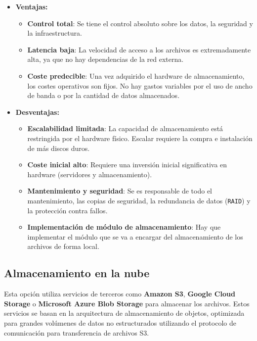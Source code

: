 \begin{itemize}
    \item \textbf{Ventajas:}
    \begin{itemize}
        \item \textbf{Control total}: Se tiene el control absoluto sobre los datos, la seguridad y la infraestructura.
        \item \textbf{Latencia baja}: La velocidad de acceso a los archivos es extremadamente alta, ya que no hay dependencias de la red externa.
        \item \textbf{Coste predecible}: Una vez adquirido el hardware de almacenamiento, los costes operativos son fijos. No hay gastos variables por el uso de ancho de banda o por la cantidad de datos almacenados.
    \end{itemize}

    \item \textbf{Desventajas:}
    \begin{itemize}
        \item \textbf{Escalabilidad limitada}: La capacidad de almacenamiento está restringida por el hardware físico. Escalar requiere la compra e instalación de más discos duros.
        \item \textbf{Coste inicial alto}: Requiere una inversión inicial significativa en hardware (servidores y almacenamiento).
        \item \textbf{Mantenimiento y seguridad}: Se es responsable de todo el mantenimiento, las copias de seguridad, la redundancia de datos (\texttt{RAID}) y la protección contra fallos.
        \item \textbf{Implementación de módulo de almacenamiento}: Hay que implementar el módulo que se va a encargar del almacenamiento de los archivos de forma local.
    \end{itemize}
\end{itemize}

\subsection{Almacenamiento en la nube}
Esta opción utiliza servicios de terceros como \textbf{Amazon S3}, \textbf{Google Cloud Storage} o \textbf{Microsoft Azure Blob Storage} para almacenar los archivos. Estos servicios se basan en la arquitectura de almacenamiento de objetos, optimizada para grandes volúmenes de datos no estructurados utilizando el protocolo de comunicación para transferencia de archivos S3.

